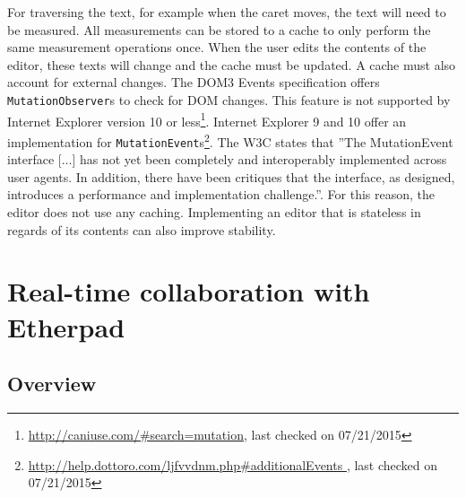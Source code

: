 For traversing the text, for example when the caret moves, the text will need to be measured. All measurements can be stored to a cache to only perform the same measurement operations once. When the user edits the contents of the editor, these texts will change and the cache must be updated. A cache must also account for external changes. The DOM3 Events specification\cite{UIEV} offers \texttt{MutationObserver}s to check for DOM changes. This feature is not supported by Internet Explorer version 10 or less\footnote{\url{http://caniuse.com/\#search=mutation}, last checked on 07/21/2015}. Internet Explorer 9 and 10 offer an implementation for \texttt{MutationEvent}s\footnote{\url{http://help.dottoro.com/ljfvvdnm.php\#additionalEvents }, last checked on 07/21/2015}. The W3C states that ''The MutationEvent interface [...] has not yet been completely and interoperably implemented across user agents. In addition, there have been critiques that the interface, as designed, introduces a performance and implementation challenge.''\cite[Legacy MutationEvent events]{UIEV}. For this reason, the editor does not use any caching. Implementing an editor that is stateless in regards of its contents can also improve stability.





\section{Real-time collaboration with Etherpad} 
\label{sec:etherpad}

\subsection{Overview}

